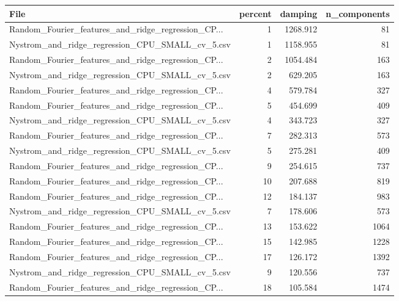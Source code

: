 \begin{tabularx}{\textwidth}{lrrr}
\toprule
                                              File &  percent &  damping &  n\_components \\
\midrule
Random\_Fourier\_features\_and\_ridge\_regression\_CP... &        1 & 1268.912 &            81 \\
   Nystrom\_and\_ridge\_regression\_CPU\_SMALL\_cv\_5.csv &        1 & 1158.955 &            81 \\
Random\_Fourier\_features\_and\_ridge\_regression\_CP... &        2 & 1054.484 &           163 \\
   Nystrom\_and\_ridge\_regression\_CPU\_SMALL\_cv\_5.csv &        2 &  629.205 &           163 \\
Random\_Fourier\_features\_and\_ridge\_regression\_CP... &        4 &  579.784 &           327 \\
Random\_Fourier\_features\_and\_ridge\_regression\_CP... &        5 &  454.699 &           409 \\
   Nystrom\_and\_ridge\_regression\_CPU\_SMALL\_cv\_5.csv &        4 &  343.723 &           327 \\
Random\_Fourier\_features\_and\_ridge\_regression\_CP... &        7 &  282.313 &           573 \\
   Nystrom\_and\_ridge\_regression\_CPU\_SMALL\_cv\_5.csv &        5 &  275.281 &           409 \\
Random\_Fourier\_features\_and\_ridge\_regression\_CP... &        9 &  254.615 &           737 \\
Random\_Fourier\_features\_and\_ridge\_regression\_CP... &       10 &  207.688 &           819 \\
Random\_Fourier\_features\_and\_ridge\_regression\_CP... &       12 &  184.137 &           983 \\
   Nystrom\_and\_ridge\_regression\_CPU\_SMALL\_cv\_5.csv &        7 &  178.606 &           573 \\
Random\_Fourier\_features\_and\_ridge\_regression\_CP... &       13 &  153.622 &          1064 \\
Random\_Fourier\_features\_and\_ridge\_regression\_CP... &       15 &  142.985 &          1228 \\
Random\_Fourier\_features\_and\_ridge\_regression\_CP... &       17 &  126.172 &          1392 \\
   Nystrom\_and\_ridge\_regression\_CPU\_SMALL\_cv\_5.csv &        9 &  120.556 &           737 \\
Random\_Fourier\_features\_and\_ridge\_regression\_CP... &       18 &  105.584 &          1474 \\

\end{tabularx}
